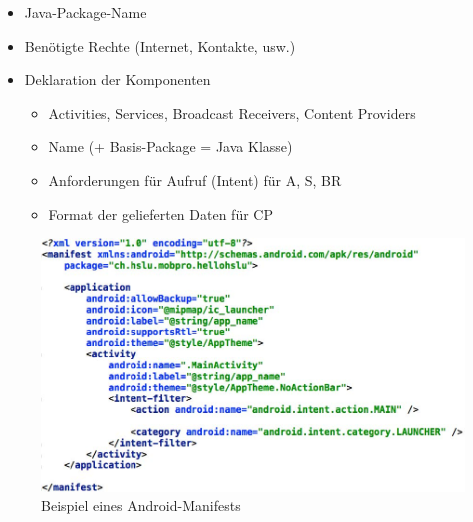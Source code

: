 \documentclass[a4paper]{article}
\begin{document}
	\begin{itemize}
		\item Java-Package-Name
		\item Benötigte Rechte (Internet, Kontakte, usw.)
		\item Deklaration der Komponenten
		\begin{itemize}
			\item Activities, Services, Broadcast Receivers, Content Providers
			\item Name (+ Basis-Package = Java Klasse)
			\item Anforderungen für Aufruf (Intent) für A, S, BR
			\item Format der gelieferten Daten für CP
		\end{itemize}
	\end{itemize}
	\begin{figure}[htb!]
		\centering
		\includegraphics[width=12cm]{img/manifestxml.jpg}
		\caption{Beispiel eines Android-Manifests}
		\label{fig:manifestxml}
	\end{figure}
\end{document}
